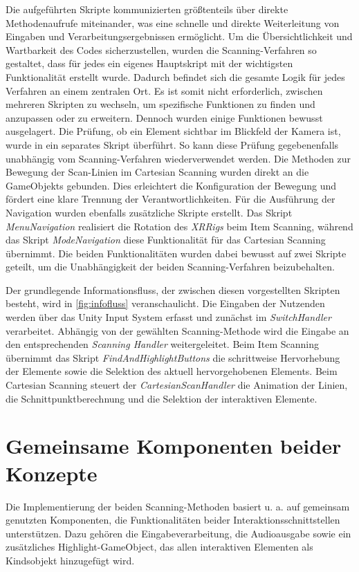 Die aufgeführten Skripte kommunizierten größtenteils über direkte Methodenaufrufe miteinander, was eine schnelle und direkte Weiterleitung von Eingaben und Verarbeitungsergebnissen ermöglicht. Um die Übersichtlichkeit und Wartbarkeit des Codes sicherzustellen, wurden die Scanning-Verfahren so gestaltet, dass für jedes ein eigenes Hauptskript mit der wichtigsten Funktionalität erstellt wurde. Dadurch befindet sich die gesamte Logik für jedes Verfahren an einem zentralen Ort. Es ist somit nicht erforderlich, zwischen mehreren Skripten zu wechseln, um spezifische Funktionen zu finden und anzupassen oder zu erweitern. Dennoch wurden einige Funktionen bewusst ausgelagert. Die Prüfung, ob ein Element sichtbar im Blickfeld der Kamera ist, wurde in ein separates Skript überführt. So kann diese Prüfung gegebenenfalls unabhängig vom Scanning-Verfahren wiederverwendet werden. Die Methoden zur Bewegung der Scan-Linien im Cartesian Scanning wurden direkt an die GameObjekts gebunden. Dies erleichtert die Konfiguration der Bewegung und fördert eine klare Trennung der Verantwortlichkeiten. Für die Ausführung der Navigation wurden ebenfalls zusätzliche Skripte erstellt. Das Skript \textit{MenuNavigation} realisiert die Rotation des \textit{XRRigs} beim Item Scanning, während das Skript \textit{ModeNavigation} diese Funktionalität für das Cartesian Scanning übernimmt. Die beiden Funktionalitäten wurden dabei bewusst auf zwei Skripte geteilt, um die Unabhängigkeit der beiden Scanning-Verfahren beizubehalten. 

Der grundlegende Informationsfluss, der zwischen diesen vorgestellten Skripten besteht, wird in \autoref{fig:infofluss} veranschaulicht. Die Eingaben der Nutzenden werden über das Unity Input System erfasst und zunächst im \textit{SwitchHandler} verarbeitet. Abhängig von der gewählten Scanning-Methode wird die Eingabe an den entsprechenden \textit{Scanning Handler} weitergeleitet. Beim Item Scanning übernimmt das Skript \textit{FindAndHighlightButtons} die schrittweise Hervorhebung der Elemente sowie die Selektion des aktuell hervorgehobenen Elements. Beim Cartesian Scanning steuert der \textit{CartesianScanHandler} die Animation der Linien, die Schnittpunktberechnung und die Selektion der interaktiven Elemente.

\section {Gemeinsame Komponenten beider Konzepte}

Die Implementierung der beiden Scanning-Methoden basiert u. a. auf gemeinsam genutzten Komponenten, die Funktionalitäten beider Interaktionsschnittstellen unterstützen. Dazu gehören die Eingabeverarbeitung, die Audioausgabe sowie ein zusätzliches Highlight-GameObject, das allen interaktiven Elementen als Kindsobjekt hinzugefügt wird. 

